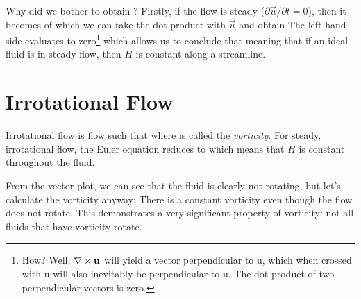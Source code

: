 \documentclass[12pt]{book}
\begin{document}
Why did we bother to obtain ?  Firstly, if the flow is steady ($\partial \vec u / \partial t = 0$), then it becomes
of which we can take the dot product with $\vec u$ and obtain
The left hand side evaluates to zero\footnote{
	How?  Well, $\curl{\vec u}$ will yield a vector perpendicular to \vec u, which when crossed with \vec u will 		also inevitably be perpendicular to \vec u.  The dot product of two perpendicular vectors is zero.} 
which allows us to conclude that
meaning that if an ideal fluid is in steady flow, then $H$ is constant along a streamline.


\section{Irrotational Flow}
Irrotational flow is flow such that 
where \gvec\omega is called the \textit{vorticity}.
For steady, irrotational flow, the Euler equation reduces to
which means that $H$ is constant throughout the fluid.




{From the vector plot, we can see that the fluid is clearly not rotating, but let's calculate the vorticity anyway:
There is a constant vorticity even though the flow does not rotate.  This demonstrates a very significant property of vorticity:  not all fluids that have vorticity rotate.
}
\end{document}
